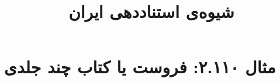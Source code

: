\documentclass[a4paper,10pt]{article}
\begin{document}
\title{شیوه‌ی استناددهی ایران
 }
\author{}
\date{}
\maketitle



\section*{مثال ۲.۱۱۰: فروست یا کتاب چند جلدی}

\cite{عربی1373}\\
\cite{حسننایبی1377}\\
\cite{boyer1986}\\
\cite{cochrane1987}\\






\end{document}
